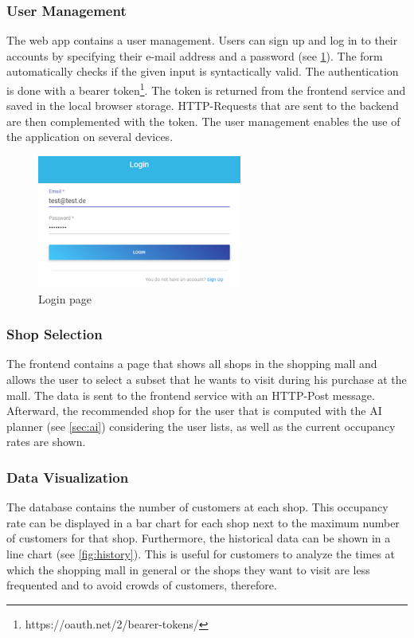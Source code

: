 \documentclass[runningheads]{llncs}
\begin{document}
\subsubsection{User Management}
The web app contains a user management. Users can sign up and log in to their accounts by specifying their e-mail address and a password (see \cref{fig:login}). The form automatically checks if the given input is syntactically valid. The authentication is done with a bearer token\footnote{https://oauth.net/2/bearer-tokens/}. The token is returned from the frontend service and saved in the local browser storage. HTTP-Requests that are sent to the backend are then complemented with the token. The user management enables the use of the application on several devices.
\begin{figure}
    \centering
    \includegraphics[width=0.6\textwidth]{assets/frontend/login.png}
    \caption{Login page}
    \label{fig:login}
\end{figure}

\subsubsection{Shop Selection}
The frontend contains a page that shows all shops in the shopping mall and allows the user to select a subset that he wants to visit during his purchase at the mall. The data is sent to the frontend service with an HTTP-Post message. Afterward, the recommended shop for the user that is computed with the AI planner (see \cref{sec:ai}) considering the user lists, as well as the current occupancy rates are shown.   

\subsubsection{Data Visualization}
The database contains the number of customers at each shop. This occupancy rate can be displayed in a bar chart for each shop next to the maximum number of customers for that shop. Furthermore, the historical data can be shown in a line chart (see \cref{fig:history}). This is useful for customers to analyze the times at which the shopping mall in general or the shops they want to visit are less frequented and to avoid crowds of customers, therefore. 
\end{document}
